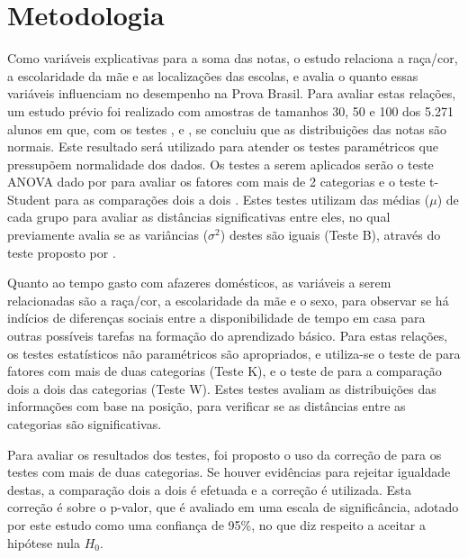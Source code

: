 

\chapter{Metodologia}
Como variáveis explicativas para a soma das notas, o estudo relaciona a raça/cor, a escolaridade da mãe e as localizações das escolas,
e avalia o quanto essas variáveis influenciam no desempenho na Prova Brasil. Para avaliar estas relações, um estudo prévio foi realizado
com amostras de tamanhos 30, 50 e 100 dos 5.271 alunos em que, com os testes , 
e , se concluiu que as distribuições das notas são normais. Este resultado será utilizado para atender
os testes paramétricos que pressupõem normalidade dos dados. Os testes a serem aplicados serão o teste ANOVA dado por  para 
avaliar os fatores com mais de 2 categorias e o teste t-Student para as comparações dois a dois \cite{o1908student}.
Estes testes utilizam das médias ($\mu$) de cada grupo para avaliar as distâncias significativas entre eles, no qual previamente avalia se as
variâncias ($\sigma^2$) destes são iguais (Teste B), através do teste proposto por .

Quanto ao tempo gasto com afazeres domésticos, as variáveis a serem relacionadas são a raça/cor, a escolaridade da mãe
e o sexo, para observar se há indícios de diferenças sociais entre a disponibilidade de tempo em casa para outras possíveis 
tarefas na formação do aprendizado básico. Para estas relações, os testes estatísticos não paramétricos são apropriados,
e utiliza-se o teste de  para fatores com mais de duas categorias (Teste K), e o
teste de  para a comparação dois a dois das categorias (Teste W). Estes testes avaliam as
distribuições das informações com base na posição, para verificar se as distâncias entre as categorias são significativas.

Para avaliar os resultados dos testes, foi proposto o uso da correção de  para os 
testes com mais de duas categorias. Se houver evidências para rejeitar igualdade destas, a comparação dois a dois é
efetuada e a correção é utilizada. Esta correção é sobre o p-valor, que é avaliado em uma escala de significância,
adotado por este estudo como uma confiança de 95\%, no que diz respeito a aceitar a hipótese nula $H_0$.